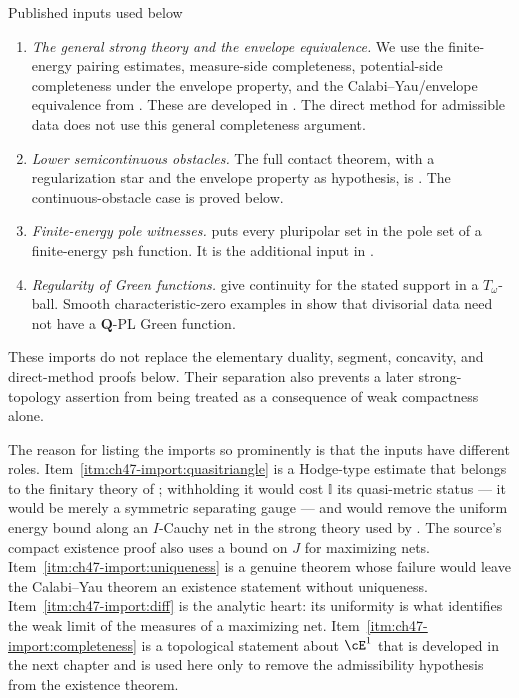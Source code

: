 \begin{important}{Published inputs used below}
\begin{enumerate}
      Monge--Amp\`ere embedding in .
      It also controls $J$ along Cauchy nets in the quoted strong theory.
\item\label{itm:ch47-import:completeness}
      \emph{The general strong theory and the envelope equivalence.}
      We use the finite-energy pairing estimates, measure-side
      completeness, potential-side completeness under the envelope
      property, and the Calabi--Yau/envelope equivalence from
      \cite[Proposition~9.19 and Theorems~10.3, 10.12, 10.14, and~12.4--12.8]{BJ22}.
      These are developed in .
      The direct method for admissible data does not use this general
      completeness argument.
\item\label{itm:ch47-import:orthogonality}
      \emph{Lower semicontinuous obstacles.}
      The full contact theorem, with a regularization star and the
      envelope property as hypothesis, is \cite[Theorem~13.1]{BJ22}.
      The continuous-obstacle case is proved below.
\item\label{itm:ch47-import:witness}
      \emph{Finite-energy pole witnesses.}
      \cite[Corollary~7.48]{BJ22} puts every pluripolar set in the pole set
      of a finite-energy psh function. It is the additional input in
      .
\item\label{itm:ch47-import:green}
      \emph{Regularity of Green functions.}
      \cite[Theorem~12.12 and Proposition~12.14(i)]{BJ22} give continuity
      for the stated support in a $T_\omega$-ball.
      Smooth characteristic-zero examples in
      \cite[Theorem~60 and Examples~63, 65]{BJGreen24} show that
      divisorial data need not have a $\mathbf Q$-PL Green function.
\end{enumerate}
These imports do not replace the elementary duality, segment, concavity,
and direct-method proofs below. Their separation also prevents a later
strong-topology assertion from being treated as a consequence of weak
compactness alone.
\end{important}

The reason for listing the imports so prominently is that the inputs have different roles.
Item~\cref{itm:ch47-import:quasitriangle} is a Hodge-type estimate that
belongs to the finitary theory of ; withholding it
would cost $\mathbb I$ its quasi-metric status --- it would be merely a
symmetric separating gauge --- and would remove the uniform energy bound
along an $I$-Cauchy net in the strong theory used by
. The source's compact existence
proof also uses a bound on $J$ for maximizing nets.
Item~\cref{itm:ch47-import:uniqueness} is a genuine theorem whose failure
would leave the Calabi--Yau theorem an existence statement without
uniqueness.  Item~\cref{itm:ch47-import:diff} is the analytic heart:
its uniformity is what identifies the weak limit of the measures of a
maximizing net.
Item~\cref{itm:ch47-import:completeness} is a topological statement about
$\cE^1$ that is developed in the next chapter and is used here only to
remove the admissibility hypothesis from the existence theorem.

